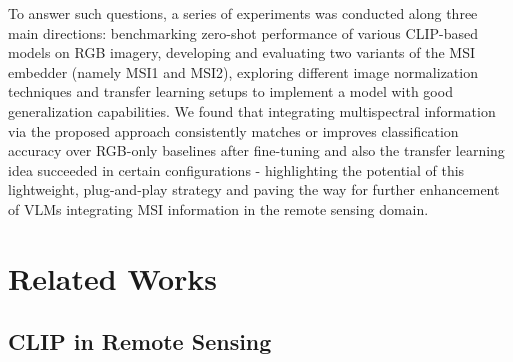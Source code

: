 \documentclass[a4paper, oneside, english]{sapthesis} %
\begin{document}
To answer such questions, a series of experiments was conducted along three main directions: benchmarking zero-shot performance of various CLIP-based models on RGB imagery, developing and evaluating two variants of the MSI embedder (namely MSI1 and MSI2), exploring different image normalization techniques and transfer learning setups to implement a model with good generalization capabilities. We found that integrating multispectral information via the proposed approach consistently matches or improves classification accuracy over RGB-only baselines after fine-tuning and also the transfer learning idea succeeded in certain configurations - highlighting the potential of this lightweight, plug-and-play strategy and paving the way for further enhancement of VLMs integrating MSI information in the remote sensing domain.

\chapter{Related Works} %

\section{CLIP in Remote Sensing}
\end{document}
